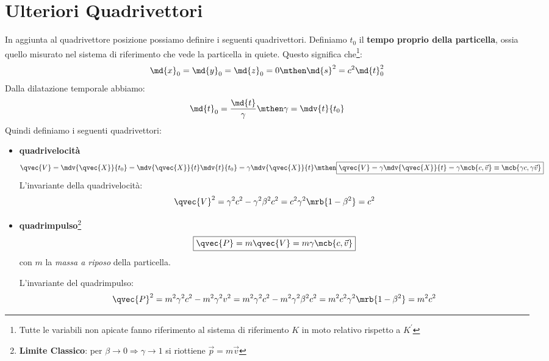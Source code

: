 \section{Ulteriori Quadrivettori}
In aggiunta al quadrivettore posizione possiamo definire i seguenti
quadrivettori. Definiamo $t_0$ il \textbf{tempo proprio della particella},
ossia quello misurato nel sistema di riferimento che vede la particella in
quiete. Questo significa che\footnote{
	Tutte le variabili non apicate fanno riferimento al sistema di riferimento
	$K$ in moto relativo rispetto a $K^\prime$
}:
\begin{equation}
	\md{x}_0 = \md{y}_0 = \md{z}_0 = 0
	\mthen
	\md{s}^2 = c^2 \md{t}_0^2
\end{equation}
Dalla dilatazione temporale abbiamo:
\begin{equation}
	\md{t}_0 = \frac{\md{t}}{\gamma}
	\mthen
	\gamma = \mdv{t}{t_0}
\end{equation}
Quindi definiamo i seguenti quadrivettori:
\begin{itemize}
	\item \textbf{quadrivelocità}
	      \begin{equation}
		      \qvec{V} = \mdv{\qvec{X}}{t_0} = \mdv{\qvec{X}}{t} \mdv{t}{t_0} =
		      \gamma \mdv{\qvec{X}}{t}
		      \mthen
		      \boxed{
			      \qvec{V}
			      = \gamma\mdv{\qvec{X}}{t}
			      = \gamma \mcb{c,\vec{v}}
			      \equiv \mcb{\gamma c, \gamma \vec{v}}
		      }
	      \end{equation}
	      L'invariante della quadrivelocità:
	      \begin{equation}
		      \qvec{V}^2 = \gamma^2c^2 - \gamma^2\beta^2c^2 =
		      c^2\gamma^2\mrb{1-\beta^2} = c^2
	      \end{equation}

	\item \textbf{quadrimpulso}\footnote{
		      \textbf{Limite Classico}: per $\beta\to 0 \Rightarrow \gamma\to 1$ si
		      riottiene $\vec{p} = m\vec{v}$
	      }
	      \begin{equation}
		      \boxed{\qvec{P} = m \qvec{V} = m \gamma \mcb{c,\vec{v}}}
	      \end{equation}
	      con $m$ la \textit{massa a riposo} della particella.\par
	      L'invariante del quadrimpulso:
	      \begin{equation}
		      \qvec{P}^2 = m^2\gamma^2c^2 - m^2\gamma^2v^2 = m^2\gamma^2c^2 -
		      m^2\gamma^2\beta^2c^2 = m^2c^2\gamma^2\mrb{1-\beta^2} = m^2c^2
	      \end{equation}
\end{itemize}

